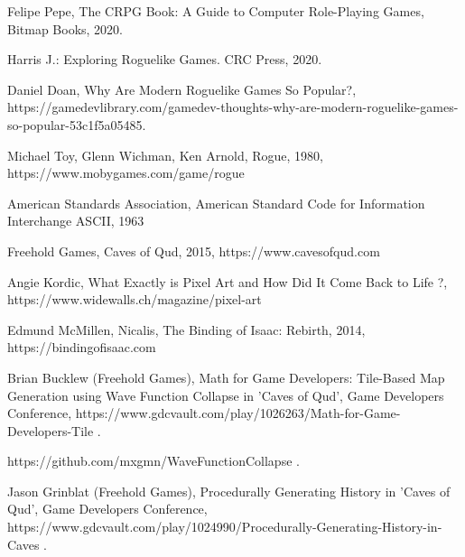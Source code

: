 \documentclass[12pt,twoside]{article}
\begin{document}
\clearpage




\begin{thebibliography}{4}
	

 Felipe Pepe, The CRPG Book: A Guide to Computer Role-Playing Games, Bitmap Books, 2020.

 Harris J.: Exploring Roguelike Games. CRC Press, 2020.

 Daniel Doan, Why Are Modern Roguelike Games So Popular?, https://gamedevlibrary.com/gamedev-thoughts-why-are-modern-roguelike-games-so-popular-53c1f5a05485.

 Michael Toy, Glenn Wichman, Ken Arnold, Rogue, 1980, https://www.mobygames.com/game/rogue

 American Standards Association, American Standard Code for Information Interchange ASCII, 1963

 Freehold Games, Caves of Qud, 2015, https://www.cavesofqud.com

 Angie Kordic, What Exactly is Pixel Art and How Did It Come Back to Life ?, https://www.widewalls.ch/magazine/pixel-art

 Edmund McMillen, Nicalis, The Binding of Isaac: Rebirth, 2014, https://bindingofisaac.com

 Brian Bucklew (Freehold Games), Math for Game Developers: Tile-Based Map Generation using Wave Function Collapse in 'Caves of Qud', Game Developers Conference, https://www.gdcvault.com/play/1026263/Math-for-Game-Developers-Tile .

 https://github.com/mxgmn/WaveFunctionCollapse .

 Jason Grinblat (Freehold Games), Procedurally Generating History in 'Caves of Qud', Game Developers Conference, https://www.gdcvault.com/play/1024990/Procedurally-Generating-History-in-Caves .


\end{thebibliography}
\end{document}
